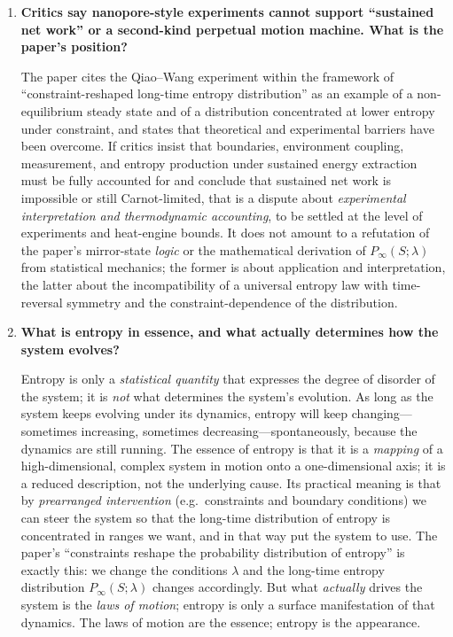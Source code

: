 \documentclass[11pt,a4paper]{article}
\begin{document}
\begin{enumerate}[leftmargin=*]
\item \textbf{Critics say nanopore-style experiments cannot support ``sustained net work'' or a second-kind perpetual motion machine. What is the paper's position?}

The paper cites the Qiao--Wang experiment within the framework of ``constraint-reshaped long-time entropy distribution'' as an example of a non-equilibrium steady state and of a distribution concentrated at lower entropy under constraint, and states that theoretical and experimental barriers have been overcome. If critics insist that boundaries, environment coupling, measurement, and entropy production under sustained energy extraction must be fully accounted for and conclude that sustained net work is impossible or still Carnot-limited, that is a dispute about \emph{experimental interpretation and thermodynamic accounting}, to be settled at the level of experiments and heat-engine bounds. It does not amount to a refutation of the paper's mirror-state \emph{logic} or the mathematical derivation of $P_{\infty}(S;\lambda)$ from statistical mechanics; the former is about application and interpretation, the latter about the incompatibility of a universal entropy law with time-reversal symmetry and the constraint-dependence of the distribution.

\item \textbf{What is entropy in essence, and what actually determines how the system evolves?}

Entropy is only a \emph{statistical quantity} that expresses the degree of disorder of the system; it is \emph{not} what determines the system's evolution. As long as the system keeps evolving under its dynamics, entropy will keep changing---sometimes increasing, sometimes decreasing---spontaneously, because the dynamics are still running. The essence of entropy is that it is a \emph{mapping} of a high-dimensional, complex system in motion onto a one-dimensional axis; it is a reduced description, not the underlying cause. Its practical meaning is that by \emph{prearranged intervention} (e.g.\ constraints and boundary conditions) we can steer the system so that the long-time distribution of entropy is concentrated in ranges we want, and in that way put the system to use. The paper's ``constraints reshape the probability distribution of entropy'' is exactly this: we change the conditions $\lambda$ and the long-time entropy distribution $P_{\infty}(S;\lambda)$ changes accordingly. But what \emph{actually} drives the system is the \emph{laws of motion}; entropy is only a surface manifestation of that dynamics. The laws of motion are the essence; entropy is the appearance.


\end{enumerate}
\end{document}
